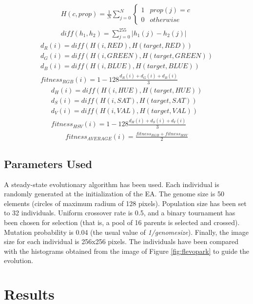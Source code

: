 \begin{eqnarray}
	\label{eq:histogram}
	H(c, prop) = \frac{1}{N}\sum_{j=0}^N \left\{\begin{matrix}
1 & prop(j) = c\\ 
0 & otherwise
\end{matrix}\right. \\
\label{eq:diff}
diff(h_1, h_2) = \sum_{j=0}^{255} |h_1(j) - h_2(j)|
\end{eqnarray}
\begin{eqnarray}
	d_R(i) = diff(H(i, RED), H(target, RED))\\
	d_G(i) = diff(H(i, GREEN), H(target, GREEN))\\
	d_B(i) =  diff(H(i, BLUE), H(target, BLUE))\\
	\label{eq:RGB}
	fitness_{RGB}(i) = 1 - 128\frac{d_R(i) + d_G(i) + d_B(i)}{3}
\end{eqnarray}
\begin{eqnarray}
	d_H(i) = diff(H(i, HUE), H(target, HUE))\\
	d_S(i) = diff(H(i, SAT), H(target, SAT))\\
	d_V(i) =  diff(H(i, VAL), H(target, VAL))\\
	\label{eq:HSV}
	fitness_{HSV}(i) = 1 - 128\frac{d_H(i) + d_S(i) + d_V(i)}{3}
\end{eqnarray}
\begin{eqnarray}
	\label{eq:AVERAGE}
	fitness_{AVERAGE}(i) = \frac{fitness_{RGB}+fitness_{HSV}}{2}
\end{eqnarray}


\subsection{Parameters Used}

A steady-state evolutionary algorithm has been used. Each individual is randomly generated at the initialization of the EA. The genome size is 50 elements (circles of maximum radium of 128 pixels). Population size has been set to 32 individuals. Uniform crossover rate is 0.5, and a binary tournament has been chosen for selection (that is, a pool of 16 parents is selected and crossed). Mutation probability is 0.04 (the usual value of {\em 1/genomesize}). Finally, the image size for each individual is 256x256 pixels. The individuals have been compared with the histograms obtained from the image of Figure \ref{fig:flevopark} to guide the evolution. 

\section{Results}
\label{sec:results}

